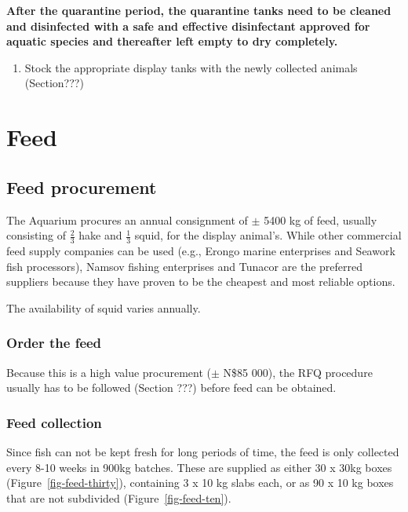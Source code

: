 \documentclass[
  12pt,
]{report}
\providecommand{\tightlist}{%
  \setlength{\itemsep}{0pt}\setlength{\parskip}{0pt}}\usepackage{longtable,booktabs,array}
\begin{document}
\textbf{After the quarantine period, the quarantine tanks need to be
cleaned and disinfected with a safe and effective disinfectant approved
for aquatic species and thereafter left empty to dry completely.}

\begin{enumerate}
\def\labelenumi{\arabic{enumi}.}
\setcounter{enumi}{29}
\tightlist
\item
  Stock the appropriate display tanks with the newly collected animals
  (Section???)
\end{enumerate}

\newpage

\hypertarget{feed}{%
\chapter{Feed}\label{feed}}

\hypertarget{feed-procurement}{%
\section{Feed procurement}\label{feed-procurement}}

The Aquarium procures an annual consignment of \(\pm\) 5400 kg of feed,
usually consisting of \(\frac{2}{3}\) hake and \(\frac{1}{3}\) squid,
for the display animal's. While other commercial feed supply companies
can be used (e.g., Erongo marine enterprises and Seawork fish
processors), Namsov fishing enterprises and Tunacor are the preferred
suppliers because they have proven to be the cheapest and most reliable
options.

{The availability of squid varies annually}.

\hypertarget{order-the-feed}{%
\subsection{Order the feed}\label{order-the-feed}}

Because this is a high value procurement (\(\pm\) N\$85 000), the RFQ
procedure usually has to be followed (Section ???) before feed can be
obtained.

\hypertarget{feed-collection}{%
\subsection{Feed collection}\label{feed-collection}}

Since fish can not be kept fresh for long periods of time, the feed is
only collected every 8-10 weeks in 900kg batches. These are supplied as
either 30 x 30kg boxes (Figure~\ref{fig-feed-thirty}), containing 3 x 10
kg slabs each, or as 90 x 10 kg boxes that are not subdivided
(Figure~\ref{fig-feed-ten}).
\end{document}
